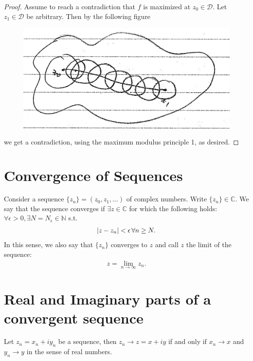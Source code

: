 \documentclass{article}
\theoremstyle{definition}
\newcommand{\C}{\mathbb{C}}
\begin{document}
\begin{proof}
	Assume to reach a contradiction that $f$ is maximized at $z_0 \in \mathcal{D}$. Let $z_1 \in \mathcal{D}$ be arbitrary. Then by the following figure
	
	\newpage
	
	\begin{figure}[!htb]
		\centering
		\includegraphics[scale=0.25]{max-mod}
	\end{figure}
	we get a contradiction, using the maximum modulus principle 1, as desired.  
\end{proof}




\section{Convergence of Sequences}

Consider a sequence $\{z_n\} = (z_0, z_1, \dots)$ of complex numbers. Write $\{z_n\} \in \C$. We say that the sequence converges if $\exists z \in \C$ for which the following holds: $\forall \epsilon > 0, \exists N = N_\epsilon \in \mathbb{N}$ s.t.
\begin{align}
\abs{z - z_n} < \epsilon\, \forall n \geq N.
\end{align}
In this sense, we also say that $\{z_n\}$ converges to $z$ and call $z$ the limit of the sequence:
\begin{align}
z = \lim_{n\to \infty} z_n.
\end{align}

\section{Real and Imaginary parts of a convergent sequence}
Let $z_n = x_n + iy_n$ be a sequence, then $z_n \to z = x+ iy$ if and only if $x_n \to x$ and $y_n \to y$ in the sense of real numbers. 
\end{document}
